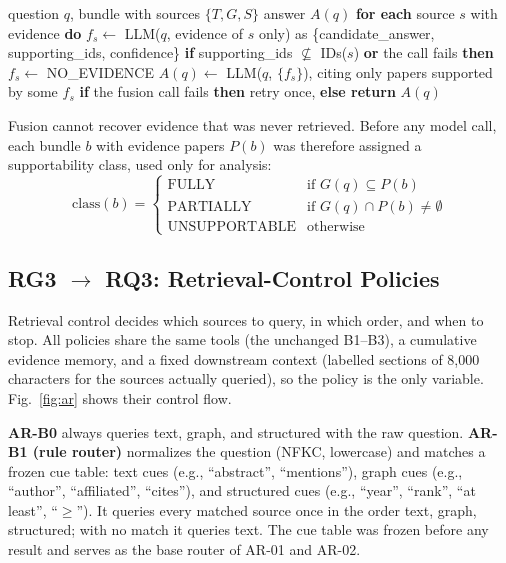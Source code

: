 \documentclass[conference]{IEEEtran}
\begin{document}
\begin{algorithm}[!t]
\caption{CF-03 late fusion with grounded findings}
\label{alg:cf03}
\begin{algorithmic}[1]
\Require question $q$, bundle with sources $\{T,G,S\}$
\Ensure answer $A(q)$
\State \textbf{for each} source $s$ with evidence \textbf{do}
\State \hspace*{1\algorithmicindent}$f_s\leftarrow$ LLM($q$, evidence of $s$ only) as \{candidate\_answer, supporting\_ids, confidence\}
\State \hspace*{1\algorithmicindent}\textbf{if} supporting\_ids $\not\subseteq$ IDs($s$) \textbf{or} the call fails \textbf{then} $f_s\leftarrow$ NO\_EVIDENCE
\State $A(q)\leftarrow$ LLM($q$, $\{f_s\}$), citing only papers supported by some $f_s$
\State \textbf{if} the fusion call fails \textbf{then} retry once, \textbf{else return} $A(q)$
\end{algorithmic}
\end{algorithm}

Fusion cannot recover evidence that was never retrieved. Before any model call, each bundle $b$ with evidence papers $P(b)$ was therefore assigned a supportability class, used only for analysis:
\begin{equation}
\mathrm{class}(b)=\begin{cases}\text{FULLY} & \text{if } G(q)\subseteq P(b)\\ \text{PARTIALLY} & \text{if } G(q)\cap P(b)\neq\emptyset\\ \text{UNSUPPORTABLE} & \text{otherwise}\end{cases}
\label{eq:supp}
\end{equation}

\subsection{RG3 $\rightarrow$ RQ3: Retrieval-Control Policies}\label{sec:ar}

Retrieval control decides which sources to query, in which order, and when to stop. All policies share the same tools (the unchanged B1--B3), a cumulative evidence memory, and a fixed downstream context (labelled sections of 8,000 characters for the sources actually queried), so the policy is the only variable. Fig.~\ref{fig:ar} shows their control flow.

\textbf{AR-B0} always queries text, graph, and structured with the raw question. \textbf{AR-B1 (rule router)} normalizes the question (NFKC, lowercase) and matches a frozen cue table: text cues (e.g., ``abstract'', ``mentions''), graph cues (e.g., ``author'', ``affiliated'', ``cites''), and structured cues (e.g., ``year'', ``rank'', ``at least'', ``$\ge$''). It queries every matched source once in the order text, graph, structured; with no match it queries text. The cue table was frozen before any result and serves as the base router of AR-01 and AR-02.
\end{document}
